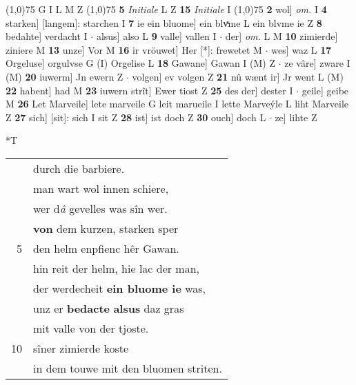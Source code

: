 \documentclass[8pt,a4paper,notitlepage]{article}
\begin{document}
\begin{table}[ht]
\begin{minipage}[t]{0.5\linewidth}
\begin{tabular}{rl}
\end{tabular}
\scriptsize
\line(1,0){75} \newline
G I L M Z \newline
\line(1,0){75} \newline
\textbf{5} \textit{Initiale} L Z  \textbf{15} \textit{Initiale} I  \newline
\line(1,0){75} \newline
\textbf{2} wol] \textit{om.} I \textbf{4} starken] [langem]: starchen I \textbf{7} ie ein bluome] ein blvͯme L ein blvme ie Z \textbf{8} bedahte] verdacht I  $\cdot$ alsus] also L \textbf{9} valle] vallen I  $\cdot$ der] \textit{om.} L M \textbf{10} zimierde] ziniere M \textbf{13} unze] Vor M \textbf{16} ir vröuwet] Her [*]: frewetet M  $\cdot$ wes] waz L \textbf{17} Orgeluse] orgulvse G (I) Orgelise L \textbf{18} Gawane] Gawan I (M) Z  $\cdot$ ze vâre] zware I (M) \textbf{20} iuwerm] Jn ewern Z  $\cdot$ volgen] ev volgen Z \textbf{21} nû wænt ir] Jr went L (M) \textbf{22} habent] had M \textbf{23} iuwern strît] Ewer tiost Z \textbf{25} des der] dester I  $\cdot$ geile] geibe M \textbf{26} Let Marveile] lete marveile G leit marueile I lette Marveýle L liht Marveile Z \textbf{27} sich] [sit]: sich I sit Z \textbf{28} ist] ist doch Z \textbf{30} ouch] doch L  $\cdot$ ze] lihte Z \newline
\end{minipage}
\hspace{0.5cm}
\begin{minipage}[t]{0.5\linewidth}
\small
\begin{center}*T
\end{center}
\begin{tabular}{rl}
 & durch die barbiere.\\ 
 & man wart wol innen schiere,\\ 
 & wer d\textit{â} gevelles was sîn wer.\\ 
 & \textbf{von} dem kurzen, starken sper\\ 
5 & den helm enpfienc hêr Gawan.\\ 
 & hin reit der helm, hie lac der man,\\ 
 & der werdecheit \textbf{ein bluome ie} was,\\ 
 & unz er \textbf{bedacte} \textbf{alsus} daz gras\\ 
 & mit valle von der tjoste.\\ 
10 & sîner zimierde koste\\ 
 & in dem touwe mit den bluomen striten.\\ 

\end{tabular}
\end{minipage}
\end{table}
\end{document}
